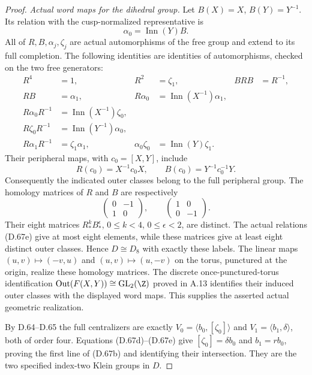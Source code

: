 \begin{proof}
\emph{Actual word maps for the dihedral group.}
Let $B(X)=X$, $B(Y)=Y^{-1}$. Its relation with the
cusp-normalized representative is
\[
                         \alpha_0=\operatorname{Inn}(Y)B.
                                                               \tag{D.67d}
\]
All of $R,B,\alpha_j,\zeta_j$ are actual automorphisms of
the free group and extend to its full completion. The
following identities are identities of automorphisms,
checked on the two free generators:
\[
 \begin{aligned}
 R^4&=1,& R^2&=\zeta_1,& BRB&=R^{-1},\\
 RB&=\alpha_1,& R\alpha_0&=\operatorname{Inn}(X^{-1})\alpha_1,\\
 R\alpha_0R^{-1}&=\operatorname{Inn}(X^{-1})\zeta_0,\\
 R\zeta_0R^{-1}&=\operatorname{Inn}(Y^{-1})\alpha_0,\\
 R\alpha_1R^{-1}&=\zeta_1\alpha_1,&
 \alpha_0\zeta_0&=\operatorname{Inn}(Y)\zeta_1.
 \end{aligned}                                               \tag{D.67e}
\]
Their peripheral maps, with $c_0=[X,Y]$, include
\[
 R(c_0)=X^{-1}c_0X,\qquad
 B(c_0)=Y^{-1}c_0^{-1}Y.                                  \tag{D.67f}
\]
Consequently the indicated outer classes belong to the
full peripheral group. The homology matrices of $R$ and
$B$ are respectively
\[
                 \begin{pmatrix}0&-1\\1&0\end{pmatrix},
                 \qquad\begin{pmatrix}1&0\\0&-1\end{pmatrix}.
                                                               \tag{D.67g}
\]
Their eight matrices $R_*^k B_*^\epsilon$, $0\leq k<4$,
$0\leq\epsilon<2$, are distinct. The actual relations
(D.67e) give at most eight elements, while these matrices
give at least eight distinct outer classes. Hence
$D\cong D_8$ with exactly these labels.
The linear maps $(u,v)\mapsto(-v,u)$ and
$(u,v)\mapsto(u,-v)$ on the torus, punctured at the origin,
realize these homology matrices. The discrete
once-punctured-torus identification
$\operatorname{Out}(F(X,Y))\cong\operatorname{GL}_2(\Z)$
proved in A.13 identifies their induced outer classes with
the displayed word maps. This supplies the asserted actual
geometric realization.

By D.64--D.65 the full centralizers are exactly
$V_0=\langle b_0,[\zeta_0]\rangle$ and
$V_1=\langle b_1,\delta\rangle$, both of order four.
Equations (D.67d)--(D.67e) give
$[\zeta_0]=\delta b_0$ and $b_1=rb_0$, proving the
first line of (D.67b) and identifying their intersection.
They are the two specified index-two Klein groups in $D$.


\end{proof}
